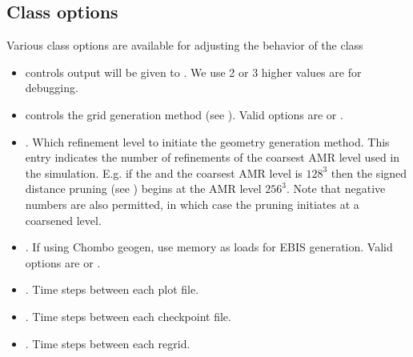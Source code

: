 \documentclass[letterpaper,10pt,english]{sphinxmanual}
\begin{document}
\subsection{Class options}
\label{\detokenize{Source/Driver:class-options}}
Various class options are available for adjusting the behavior of the  class
\begin{itemize}
\item {} 
 controls output will be given to . We use 2 or 3 \sphinxhyphen{} higher values are for debugging.

\item {} 
 controls the grid generation method (see {\hyperref[\detokenize{Source/SpatialDiscretization:chap-geometrygeneration}]{}}).
Valid options are  or .

\item {} 
.
Which refinement level to initiate the  geometry generation method.
This entry indicates the number of refinements of the coarsest AMR level used in the simulation.
E.g. if the  and the coarsest AMR level is \(128^3\) then the signed distance pruning (see {\hyperref[\detokenize{Source/SpatialDiscretization:chap-geometrygeneration}]{}}) begins at the AMR level \(256^3\).
Note that negative numbers are also permitted, in which case the pruning initiates at a coarsened level.

\item {} 
. If using Chombo geo\sphinxhyphen{}gen, use memory as loads for EBIS generation. Valid options are  or .

\item {} 
. Time steps between each plot file.

\item {} 
. Time steps between each checkpoint file.

\item {} 
. Time steps between each regrid.


\end{itemize}
\end{document}
